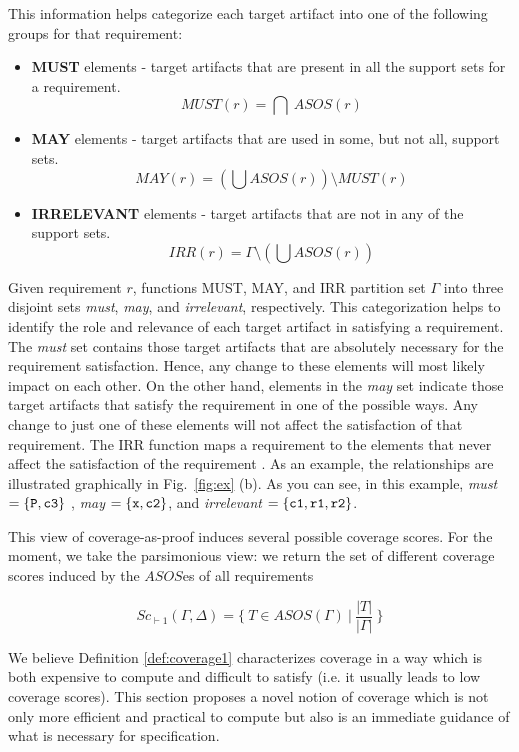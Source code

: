 This information helps categorize each target artifact into one of the following groups for that requirement:

\begin{itemize}
  \item \textbf{MUST} elements - target artifacts that are present in all the support sets for a requirement.
      $$ MUST (r) = \bigcap \ ASOS(r) $$

  \item \textbf{MAY} elements - target artifacts that are used in some, but not all, support sets.
      $$MAY(r) = (\bigcup ASOS (r)) \setminus MUST (r) $$

  \item \textbf{IRRELEVANT} elements - target artifacts that are not in any of the support sets. $$IRR(r) = \Gamma \setminus (\bigcup ASOS (r))$$
\end{itemize}

Given requirement $r$, functions MUST, MAY, and IRR partition set $\Gamma$ into three disjoint sets \emph{must}, \emph{may}, and \emph{irrelevant}, respectively. This categorization helps to identify the role and relevance of each target artifact in satisfying a requirement. The \emph{must} set contains those target artifacts that are absolutely necessary for the requirement satisfaction. Hence, any change to these elements will most likely impact on each other. On the other hand, elements in the \emph{may} set indicate those target artifacts that satisfy the requirement in one of the possible ways.  Any change to just one of these elements will not affect the satisfaction of that requirement. The IRR function maps a requirement to the elements that never affect the satisfaction of the requirement \cite{Murugesan16:renext}. As an example, the relationships are illustrated graphically in Fig.~\ref{fig:ex} (b). As you can see, in this example,
\emph{must} $= \{ {\tt P}, {\tt c3}\}$ ,
\emph{may} $= \{ {\tt x}, {\tt c2}\}$, and \emph{irrelevant} $= \{ {\tt c1}, {\tt r1}, {\tt r2}\}$.

This view of coverage-as-proof induces several possible coverage scores.  For the moment, we take the parsimonious view: we return the set of different coverage scores induced by the $ASOS$es of all requirements

\[
   Sc_{\vdash 1}(\Gamma, \Delta) = \{~T \in ASOS(\Gamma)~|~\frac{ | T |}{|\Gamma|}~\}
\]

We believe Definition \ref{def:coverage1} characterizes coverage in a way which is both expensive to compute and difficult to satisfy (i.e. it usually leads to low coverage scores). This section proposes a novel notion of coverage which is not only more efficient and practical to compute but also  is an immediate guidance of what is necessary for specification.

